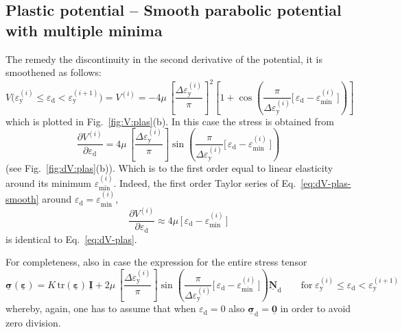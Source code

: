 \documentclass[times,namecite]{goose-article}
\newcommand\T[1]{\underline{\bm{{#1}}}}
\begin{document}
\subsection{Plastic potential -- Smooth parabolic potential with multiple minima}

The remedy the discontinuity in the second derivative of the potential, it is smoothened as follows:
\begin{equation}\label{eq:V-plas-smooth}
  V \big(
    \varepsilon_\mathrm{y}^{(i)} \leq \varepsilon_\mathrm{d} < \varepsilon_\mathrm{y}^{(i+1)}
  \big)
  =
  V^{(i)}
  =
  - 4 \mu \,
  \left[ \frac{\Delta \varepsilon_\mathrm{y}^{(i)}}{\pi} \right]^2
  \left[
    1
    +
    \cos \left(
      \frac{ \pi }{ \Delta \varepsilon_\mathrm{y}^{(i)} }
      \Big[\, \varepsilon_\mathrm{d} - \varepsilon_\mathrm{min}^{(i)} \,\Big]
    \right)
  \right]
\end{equation}
which is plotted in Fig.~\ref{fig:V:plas}(b). In this case the stress is obtained from
\begin{equation}\label{eq:dV-plas-smooth}
  \frac{\partial V^{(i)}}{\partial \varepsilon_\mathrm{d}}
  =
  4 \mu \,
  \left[ \frac{\Delta \varepsilon_\mathrm{y}^{(i)}}{\pi} \right]
  \sin \left(
    \frac{ \pi }{ \Delta \varepsilon_\mathrm{y}^{(i)} }
    \Big[\, \varepsilon_\mathrm{d} - \varepsilon_\mathrm{min}^{(i)} \,\Big]
  \right)
\end{equation}
(see Fig.~\ref{fig:dV:plas}(b)). Which is to the first order equal to linear elasticity around its minimum $\varepsilon_\mathrm{min}^{(i)}$. Indeed, the first order Taylor series of Eq.~\eqref{eq:dV-plas-smooth} around $\varepsilon_\mathrm{d} = \varepsilon_\mathrm{min}^{(i)}$,
\begin{equation}
  \frac{\partial V^{(i)}}{\partial \varepsilon_\mathrm{d}}
  \approx
  4 \mu \, \Big[\, \varepsilon_\mathrm{d} - \varepsilon_\mathrm{min}^{(i)} \,\Big]
\end{equation}
is identical to Eq.~\eqref{eq:dV-plas}.

For completeness, also in case the expression for the entire stress tensor
\begin{equation}
  \T{\sigma} ( \T{\varepsilon} )
  =
  K \, \text{tr} ( \T{\varepsilon} ) \, \T{I}
  +
  2 \mu \,
  \left[ \frac{\Delta \varepsilon_\mathrm{y}^{(i)}}{\pi} \right]
  \sin \left(
    \frac{ \pi }{ \Delta \varepsilon_\mathrm{y}^{(i)} }
    \Big[\, \varepsilon_\mathrm{d} - \varepsilon_\mathrm{min}^{(i)} \,\Big]
  \right)
  \T{N}_\mathrm{d}
  \qquad
  \mathrm{for}
  \;
  \varepsilon_\mathrm{y}^{(i)} \leq \varepsilon_\mathrm{d} < \varepsilon_\mathrm{y}^{(i+1)}
\end{equation}
whereby, again, one has to assume that when $\varepsilon_\mathrm{d} = 0$ also $\T{\sigma}_\mathrm{d} = \T{0}$ in order to avoid zero division.
\end{document}
